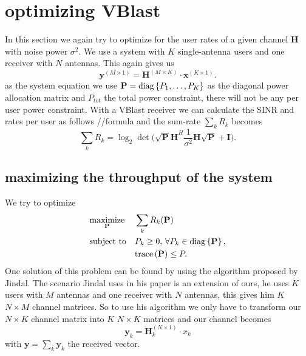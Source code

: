 \section{optimizing VBlast}
In this section we again try to optimize for the user rates of a given channel $\mathbf{H}$ with noise power $\sigma^2$. We use a system with $K$ single-antenna users and one receiver with $N$ antennas. This again gives us
\begin{equation}
	\mathbf{y}^{(M\times 1)} = \mathbf{H}^{(M\times K)}\cdot \mathbf{x}^{(K\times 1)}.
\end{equation}
as the system equation we use $\mathbf{P}=\mathrm{diag}\left\lbrace P_1,\dots,P_K\right\rbrace$ as the diagonal power allocation matrix and $P_{tot}$ the total power constraint, there will not be any per user power constraint. With a VBlast receiver we can calculate the SINR and rates per user as follows
//formula
and the sum-rate $\sum_k{R_k}$ becomes
\begin{equation}
	\sum_k{R_k}=\log_2{\det{\Biggr(\mathbf{\sqrt{P}H}^H\frac{1}{\sigma^2}\mathbf{H\sqrt{P}}+\mathbf{I}\Biggl)}}.
\end{equation}
\subsection{maximizing the throughput of the system}
We try to optimize
\begin{equation}
	\begin{aligned}
		& \underset{\mathbf{P}}{\text{maximize}}
		& & \sum_k{R_k(\mathbf{P})} \\
		& \text{subject to}
		& & P_k\geq 0,\,\forall P_k\in \mathrm{diag}\left\lbrace\mathbf{P}\right\rbrace, \\
		&&& \text{trace}\left(\mathbf{P}\right)\leq P.
	\end{aligned}
\end{equation}
One solution of this problem can be found by using the algorithm proposed by Jindal. The scenario Jindal uses in his paper is an extension of ours, he uses $K$ users with $M$ antennas and one receiver with $N$ antennas, this gives him $K$ $N\times M$ channel matrices. So to use his algorithm we only have to transform our $N\times K$ channel matrix into $K$ $N\times K$ matrices and our channel becomes
\begin{equation}
	\mathbf{y}_k = \mathbf{H}_k^{(N\times 1)} \cdot x_k
\end{equation}
with $\mathbf{y} = \sum_k{\mathbf{y}_k}$ the received vector.

